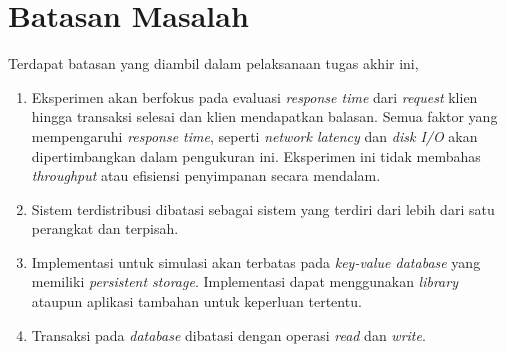 \section{Batasan Masalah}

Terdapat batasan yang diambil dalam pelaksanaan tugas akhir ini,

\begin{enumerate}
    \item Eksperimen akan berfokus pada evaluasi \textit{response time} dari \textit{request} klien hingga transaksi selesai dan klien mendapatkan balasan. Semua faktor yang mempengaruhi \textit{response time}, seperti \textit{network latency} dan \textit{disk I/O} akan dipertimbangkan dalam pengukuran ini. Eksperimen ini tidak membahas \textit{throughput} atau efisiensi penyimpanan secara mendalam. 
    \item Sistem terdistribusi dibatasi sebagai sistem yang terdiri dari lebih dari satu perangkat dan terpisah.
    \item Implementasi untuk simulasi akan terbatas pada \textit{key-value database} yang memiliki \textit{persistent storage}. Implementasi dapat menggunakan \textit{library} ataupun aplikasi tambahan untuk keperluan tertentu.
    \item Transaksi pada \textit{database} dibatasi dengan operasi \textit{read} dan \textit{write}.
\end{enumerate}

